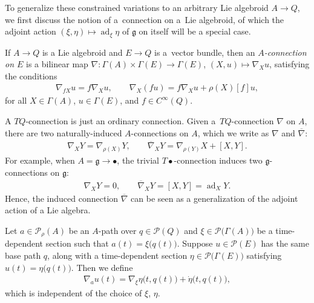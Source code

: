 \documentclass[10pt,a4paper]{amsart}
\numberwithin{equation}{section}
\begin{document}
To generalize these constrained variations to an arbitrary Lie algebroid $ A \rightarrow Q $, we f\/irst discuss the notion of a~connection on a~Lie algebroid, of which the adjoint action $ ( \xi, \eta ) \mapsto \operatorname{ad} _\xi \eta $ of $ \mathfrak{g} $ on itself will be a special case.

\begin{Definition} If $ A \rightarrow Q $ is a Lie algebroid and $ E \rightarrow Q $ is a~vector bundle, then an \emph{$A$-connection on $E$} is a bilinear map $ \nabla \colon \Gamma (A) \times \Gamma (E) \rightarrow \Gamma (E)$, $( X, u ) \mapsto \nabla _X u $, satisfying the conditions
 \begin{gather*}
 \nabla _{ f X } u = f \nabla _X u , \qquad \nabla _X ( f u ) = f \nabla _X u + \rho (X) [f] u ,
 \end{gather*}
 for all $ X \in \Gamma (A) $, $ u \in \Gamma (E) $, and $ f \in C ^\infty (Q) $.
\end{Definition}

\begin{Remark}
 A $ T Q $-connection is just an ordinary connection. Given a~$ T Q $-connection $ \nabla $ on $A$, there are two naturally-induced $A$-connections on $A$, which we write as $ \nabla $ and $ \overline{ \nabla } $:
 \begin{gather*}
 \nabla _X Y = \nabla _{\rho (X)} Y, \qquad \overline{ \nabla } _X Y = \nabla _{ \rho (Y) } X + \left[ X, Y
 \right] .
 \end{gather*}
 For example, when $ A = \mathfrak{g} \rightarrow \bullet $, the trivial $ T \bullet $-connection induces two $ \mathfrak{g} $-connections on $\mathfrak{g}$:
 \begin{gather*}
 \nabla _X Y = 0 , \qquad \overline{ \nabla } _X Y = [X, Y] = \operatorname{ad} _X Y .
 \end{gather*}
 Hence, the induced connection $ \overline{ \nabla } $ can be seen as a generalization of the adjoint action of a Lie algebra.
\end{Remark}

\begin{Definition} \label{def:pathConnection}
Let $ a \in \mathcal{P} _\rho (A) $ be an $A$-path over $ q \in \mathcal{P} (Q) $ and $ \xi \in \mathcal{P} \bigl( \Gamma (A) \bigr) $ be a time-dependent section such that $ a (t) = \xi \bigl( q (t) \bigr) $. Suppose $ u \in \mathcal{P} (E) $ has the same base path $q$, along
 with a time-dependent section $ \eta \in \mathcal{P} \bigl( \Gamma (E) \bigr) $ satisfying $ u (t) = \eta \bigl( q (t) \bigr) $. Then we def\/ine
 \begin{gather*}
 \nabla _a u (t) = \nabla _\xi \eta \bigl( t, q (t) \bigr) + \dot{\eta } \bigl( t, q (t) \bigr) ,
 \end{gather*}
which is independent of the choice of $ \xi$, $\eta $.
\end{Definition}
\end{document}

